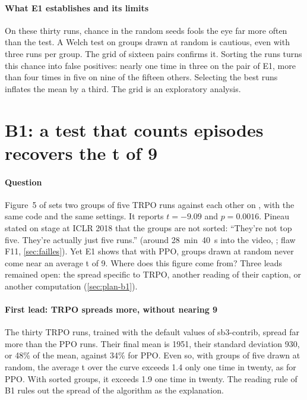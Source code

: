 

\paragraph{What E1 establishes and its limits}
On these thirty runs, chance in the random seeds fools the eye far more often than the test. A Welch test on
groups drawn at random is cautious, even with three runs per group. The grid of sixteen pairs confirms it.
Sorting the runs turns this chance into false positives: nearly one time in three on the pair of E1,
more than four times in five on nine of the fifteen others. Selecting the best runs inflates the mean by a
third. The grid is an exploratory analysis.

\section{B1: a test that counts episodes recovers the t of 9}\label{sec:b1}

\paragraph{Question}
Figure~5 of \textcite{henderson2018matters} sets two groups of five TRPO runs against each other on
, with the same code and the same settings. It reports $t=-9.09$ and $p=0.0016$. Pineau
stated on stage at ICLR 2018 that the groups are not sorted: \enquote{They're not top five. They're actually just five runs.} (around 28~min~40~s into the video, \cite{pineau2018iclr}; flaw F11, \cref{sec:failles}). Yet E1 shows that with PPO, groups drawn at random never come
near an average t of 9. Where does this figure come from? Three leads remained open: the spread specific to
TRPO, another reading of their caption, or another computation (\cref{sec:plan-b1}).

\paragraph{First lead: TRPO spreads more, without nearing 9}
The thirty TRPO runs, trained with the default values of sb3-contrib, spread far more than the PPO runs. Their
final mean is \num{1951}, their standard deviation 930, or 48\% of the mean, against 34\% for PPO. Even so,
with groups of five drawn at random, the average t over the curve exceeds 1.4 only one time in twenty, as for
PPO. With sorted groups, it exceeds 1.9 one time in twenty. The reading rule of B1 rules out
the spread of the algorithm as the explanation.

